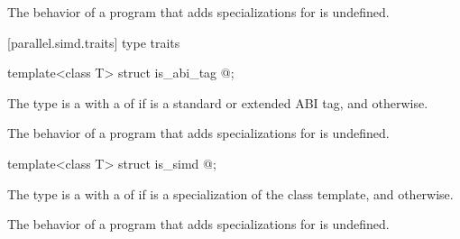 \pnum
The behavior of a program that adds specializations for  is undefined.

[parallel.simd.traits]{ type traits}

\begin{itemdecl}
template<class T> struct is_abi_tag { @\seebelow@ };
\end{itemdecl}
\begin{itemdescr}
\pnum
The type  is a  with a  of  if  is a standard or extended ABI tag, and  otherwise.

\pnum
The behavior of a program that adds specializations for  is undefined.
\end{itemdescr}

\begin{itemdecl}
template<class T> struct is_simd { @\seebelow@ };
\end{itemdecl}
\begin{itemdescr}
\pnum
The type  is a  with a  of  if  is a specialization of the  class template, and  otherwise.

\pnum
The behavior of a program that adds specializations for  is undefined.
\end{itemdescr}

